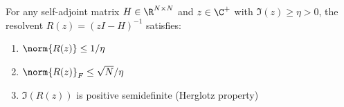 \begin{lemma}\label{lem:resolvent-bounds}
For any self-adjoint matrix $H \in \R^{N \times N}$ and $z \in \C^+$ with $\Im(z) \geq \eta > 0$, the resolvent $R(z) = (zI - H)^{-1}$ satisfies:
\begin{enumerate}
\item $\norm{R(z)} \leq 1/\eta$
\item $\norm{R(z)}_F \leq \sqrt{N}/\eta$
\item $\Im(R(z))$ is positive semidefinite (Herglotz property)
\end{enumerate}
\end{lemma}
